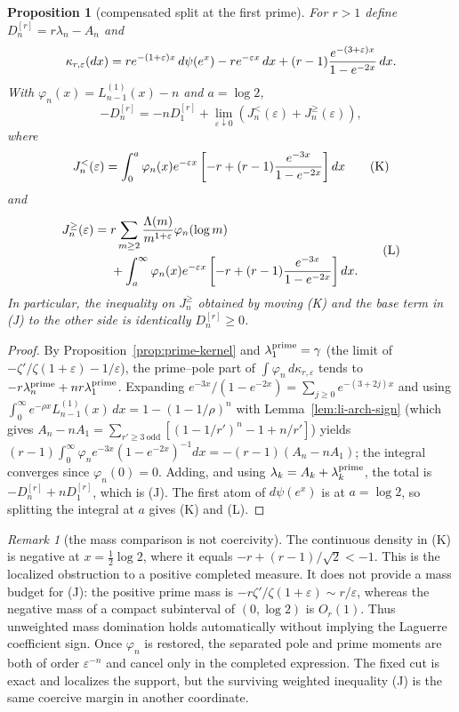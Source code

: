 \documentclass[11pt]{amsart}
\newtheorem{proposition}[theorem]{Proposition}
\theoremstyle{definition}
\theoremstyle{remark}
\newtheorem{remark}[theorem]{Remark}
\theoremstyle{definition}
\begin{document}
\begin{proposition}[compensated split at the first prime]\label{prop:log2-compensated}
For $r>1$ define $D_n^{[r]}=r\lambda_n-A_n$ and
\[
 \kappa_{r,\varepsilon}(dx)
 =r e^{-(1+\varepsilon)x}\,d\psi(e^x)
 -r e^{-\varepsilon x}\,dx
 +(r-1){e^{-(3+\varepsilon)x}\over1-e^{-2x}}\,dx.
\]
With $\varphi_n(x)=L_{n-1}^{(1)}(x)-n$ and $a=\log2$,
\[
 -D_n^{[r]}=-nD_1^{[r]}+
 \lim_{\varepsilon\downarrow0}
 \left(J_n^<(\varepsilon)+J_n^\ge(\varepsilon)\right),         \tag{J}
\]
where
\[
 J_n^<(\varepsilon)=
 \int_0^a\varphi_n(x)e^{-\varepsilon x}
 \left[-r+(r-1){e^{-3x}\over1-e^{-2x}}\right]dx               \tag{K}
\]
and
\[
 \begin{split}
 J_n^\ge(\varepsilon)={}&
 r\sum_{m\ge2}{\Lambda(m)\over m^{1+\varepsilon}}
 \varphi_n(\log m)\\
 &+\int_a^\infty\varphi_n(x)e^{-\varepsilon x}
 \left[-r+(r-1){e^{-3x}\over1-e^{-2x}}\right]dx .
 \end{split}                                                   \tag{L}
\]
In particular, the inequality on $J_n^\ge$ obtained by moving (K) and the
base term in (J) to the other side is identically $D_n^{[r]}\ge0$.
\end{proposition}

\begin{proof}
By Proposition~\ref{prop:prime-kernel} and $\lambda_1^{\rm prime}=\gamma$ (the limit of
$-\zeta'/\zeta(1+\varepsilon)-1/\varepsilon$), the prime--pole part of
$\int\varphi_n\,d\kappa_{r,\varepsilon}$ tends to $-r\lambda_n^{\rm prime}+nr\lambda_1^{\rm prime}$.
Expanding $e^{-3x}/(1-e^{-2x})=\sum_{j\ge0}e^{-(3+2j)x}$ and using
$\int_0^\infty e^{-\rho x}L_{n-1}^{(1)}(x)\,dx=1-(1-1/\rho)^n$ with Lemma~\ref{lem:li-arch-sign}
(which gives $A_n-nA_1=\sum_{r'\ge3\ \mathrm{odd}}[(1-1/r')^n-1+n/r']$) yields
$(r-1)\int_0^\infty\varphi_n e^{-3x}(1-e^{-2x})^{-1}dx=-(r-1)(A_n-nA_1)$; the integral converges
since $\varphi_n(0)=0$.  Adding, and using $\lambda_k=A_k+\lambda_k^{\rm prime}$, the total is
$-D_n^{[r]}+nD_1^{[r]}$, which is (J).  The first atom of $d\psi(e^x)$ is at $a=\log2$, so splitting
the integral at $a$ gives (K) and (L).
\end{proof}

\begin{remark}[the mass comparison is not coercivity]\label{rmk:log2-mass}
The continuous density in (K) is negative at
$x=\frac12\log2$, where it equals
$-r+(r-1)/\sqrt2<-1$.  This is the localized obstruction to a positive
completed measure.  It does not provide a mass budget for (J): the positive
prime mass is
$-r\zeta'/\zeta(1+\varepsilon)\sim r/\varepsilon$, whereas the negative
mass of a compact subinterval of $(0,\log2)$ is $O_r(1)$.  Thus unweighted
mass domination holds automatically without implying the Laguerre
coefficient sign.  Once $\varphi_n$ is restored, the separated pole and
prime moments are both of order $\varepsilon^{-n}$ and cancel only in the
completed expression.  The fixed cut is exact and localizes the
support, but the surviving weighted inequality (J) is the same
coercive margin in another coordinate.
\end{remark}
\end{document}
